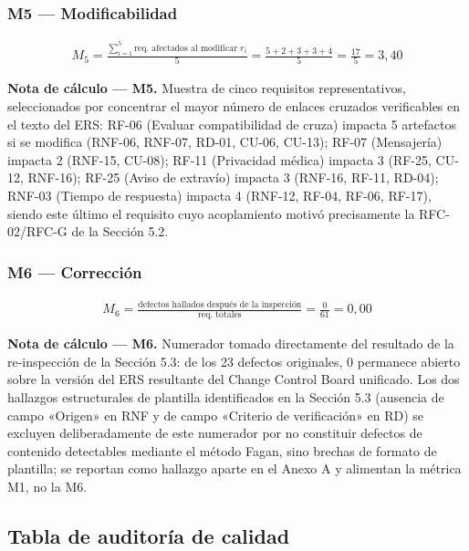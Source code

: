 \documentclass[11pt]{article}
\begin{document}
	\subsubsection*{M5 --- Modificabilidad}
	
	{\setlength{\jot}{8pt}
		\begin{align*}
			M_5 = \frac{\sum_{i=1}^{5} \text{req. afectados al modificar } r_i}{5} = \frac{5+2+3+3+4}{5} = \frac{17}{5} = 3{,}40
	\end{align*}}
	
	\textbf{Nota de cálculo --- M5.} Muestra de cinco requisitos representativos, seleccionados por concentrar el mayor número de enlaces cruzados verificables en el texto del ERS: RF-06 (Evaluar compatibilidad de cruza) impacta 5 artefactos si se modifica (RNF-06, RNF-07, RD-01, CU-06, CU-13); RF-07 (Mensajería) impacta 2 (RNF-15, CU-08); RF-11 (Privacidad médica) impacta 3 (RF-25, CU-12, RNF-16); RF-25 (Aviso de extravío) impacta 3 (RNF-16, RF-11, RD-04); RNF-03 (Tiempo de respuesta) impacta 4 (RNF-12, RF-04, RF-06, RF-17), siendo este último el requisito cuyo acoplamiento motivó precisamente la RFC-02/RFC-G de la Sección 5.2.
	
	\subsubsection*{M6 --- Corrección}
	
	{\setlength{\jot}{8pt}
		\begin{align*}
			M_6 = \frac{\text{defectos hallados después de la inspección}}{\text{req. totales}} = \frac{0}{61} = 0{,}00
	\end{align*}}
	
	\textbf{Nota de cálculo --- M6.} Numerador tomado directamente del resultado de la re-inspección de la Sección 5.3: de los 23 defectos originales, 0 permanece abierto sobre la versión del ERS resultante del Change Control Board unificado. Los dos hallazgos estructurales de plantilla identificados en la Sección 5.3 (ausencia de campo «Origen» en RNF y de campo «Criterio de verificación» en RD) se excluyen deliberadamente de este numerador por no constituir defectos de contenido detectables mediante el método Fagan, sino brechas de formato de plantilla; se reportan como hallazgo aparte en el Anexo A y alimentan la métrica M1, no la M6.
	
	\subsection{Tabla de auditoría de calidad}
	
\end{document}
